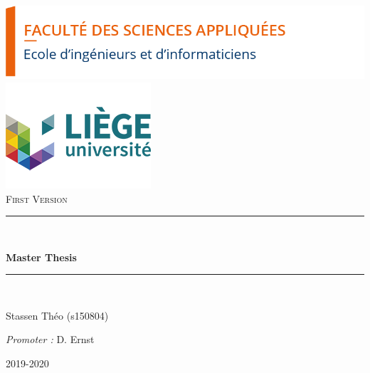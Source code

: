 \documentclass[a4paper, 12pt]{article}
\newcommand{\HRule}{\rule{\linewidth}{0.5mm}}
\begin{document}
\begin{titlepage}

  	\begin{center} 

	
    \includegraphics[scale=0.35]{logo_fsa.png}  %
    \includegraphics[scale=0.6]{logo_Ulg.png}\\[1.15cm]
   		\textsc{\Large First Version}\\[1.2cm]

    	\HRule 
    	\\[0.4cm]
    	{\bfseries \LARGE     Master Thesis
    	\\[0.4cm] 

    	\HRule} \\[2cm]
    	
    \begin{minipage}{0.4\textwidth}
      \begin{flushleft} \large
         Stassen Théo (s150804)
      \end{flushleft}
    \end{minipage}
    \begin{minipage}{0.4\textwidth}
      \begin{flushright} \large
        \emph{Promoter :} D. Ernst \\      
      \end{flushright}
    \end{minipage}

    \vfill

    \large 2019-2020

  \end{center}
\end{titlepage}

\newpage






\newpage
\nocite{*}
\printbibliography
\end{document}
